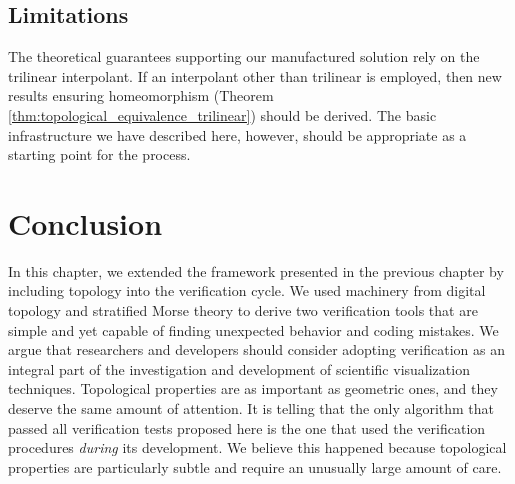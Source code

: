 
\subsection{Limitations}
The theoretical guarantees supporting our manufactured solution
rely on the trilinear interpolant.  
If an interpolant other than trilinear is employed, then new results ensuring
homeomorphism (Theorem \ref{thm:topological_equivalence_trilinear}) should be derived. 
The basic infrastructure we have described here, however,
should be appropriate as a starting point for the process.


\section{Conclusion}

In this chapter, we extended the framework presented in the previous chapter
by including topology into the verification
cycle.  We used machinery from digital topology and stratified Morse
theory to derive two verification tools that are simple and yet
capable of finding unexpected behavior and coding mistakes.
%
We argue that researchers and developers should consider adopting
verification as an integral part of the investigation and development
of scientific visualization techniques.  Topological properties are as
important as geometric ones, and they deserve the same amount of
attention. It is telling that the only algorithm that passed all
verification tests proposed here is the one that used
the verification procedures \emph{during} its development. We believe
this happened because topological properties are particularly subtle
and require an unusually large amount of care.


